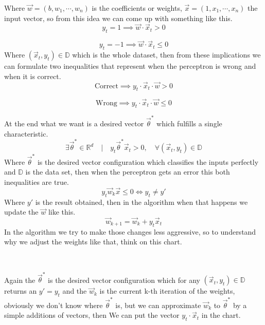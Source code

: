 \documentclass[12pt]{article}
\begin{document}
Where $\vec{w} = (b, w_1, \cdots, w_n)$
is the coefficients or weights, $\vec{x} = (1, x_1, \cdots, x_n)$
the input vector, so from this idea we can come up
with something like this.
\[
  y_t = 1 \implies \vec{w} \cdot \vec{x}_t > 0
\]

\[
  y_t =  - 1 \implies \vec{w} \cdot \vec{x}_t \le 0
\]
Where $(\vec{x}_t, y_t) \in \mathbb{D}$ which is the whole dataset, then from these implications
we can formulate two inequalities that
represent when the perceptron is wrong and when it is correct.
\[
  \text{Correct} \implies y_t \cdot \vec{x}_t \cdot \vec{w} > 0
\]

\[
  \text{Wrong} \implies y_t \cdot \vec{x}_t \cdot \vec{w} \le 0
\]

At the end what we want is a desired vector $\vec{\theta}^*$ which fulfills a single characteristic.
\[
  \exists \vec{\theta}^* \in \mathbb{R}^{d} \quad|\quad y_t\vec{\theta}^*\vec{x}_t > 0,\quad
  \forall (\vec{x}_t, y_t) \in \mathbb{D}
\]
Where $\vec{\theta}^*$ is the desired vector configuration which classifies the inputs perfectly
and $\mathbb{D}$ is the data set,
then when the perceptron gets an error this both inequalities are true.
\[
  y_t\vec{w}_k \vec{x} \le 0 \Leftrightarrow  y_t \not = y'
\]
Where $y'$ is the result obtained,
then in the algorithm when that happens we update the $\vec{w}$ like this.
\[
  \vec{w}_{k + 1} = \vec{w}_{k} + y_t\vec{x}_t
\]
In the algorithm we try to make those changes less aggressive, so to understand
why we adjust the weights like that, think on this chart.
\begin{center}
 \\
\end{center}
Again the $\vec{\theta}^*$ is the desired vector configuration which for any
$(\vec{x}_t, y_t) \in \mathbb{D}$ returns an $y' = y_t$ and the $\vec{w}_k$ is the current k-th iteration
of the weights, obviously we don't know where $\vec{\theta}^*$ is, but we can approximate $\vec{w}_k$
to $\vec{\theta}^*$ by a 
simple additions of vectors,
then We can put the vector $y_t \cdot \vec{x}_t$ in the chart.
\begin{center}
 \\
\end{center}
\end{document}
